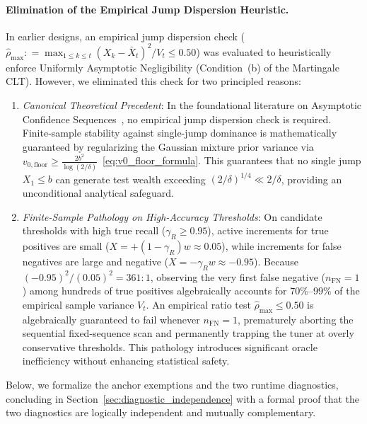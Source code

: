 \documentclass[11pt,a4paper]{article}
\newcommand{\coloneqq}{\mathrel{\mathop:}=}
\begin{document}
\paragraph{Elimination of the Empirical Jump Dispersion Heuristic.}
In earlier designs, an empirical jump dispersion check ($\hat{\rho}_{\max} \coloneqq \max_{1 \le k \le t}(X_k - \bar{X}_t)^2 / V_t \le 0.50$) was evaluated to heuristically enforce Uniformly Asymptotic Negligibility (Condition~(b) of the Martingale CLT). However, we eliminated this check for two principled reasons:
\begin{enumerate}[leftmargin=*]
    \item \emph{Canonical Theoretical Precedent}: In the foundational literature on Asymptotic Confidence Sequences~\cite{waudbysmith2024asymptotic,howard2021}, no empirical jump dispersion check is required. Finite-sample stability against single-jump dominance is mathematically guaranteed by regularizing the Gaussian mixture prior variance via $v_{0, \text{floor}} \ge \frac{2 b^2}{\log(2/\delta)}$~\eqref{eq:v0_floor_formula}. This guarantees that no single jump $X_1 \le b$ can generate test wealth exceeding $(2/\delta)^{1/4} \ll 2/\delta$, providing an unconditional analytical safeguard.
    \item \emph{Finite-Sample Pathology on High-Accuracy Thresholds}: On candidate thresholds with high true recall ($\gamma_R \ge 0.95$), active increments for true positives are small ($X = +(1 - \gamma_R) w \approx 0.05$), while increments for false negatives are large and negative ($X = -\gamma_R w \approx -0.95$). Because $(-0.95)^2 / (0.05)^2 = 361:1$, observing the very first false negative ($n_{\text{FN}} = 1$) among hundreds of true positives algebraically accounts for $70\%\text{--}99\%$ of the empirical sample variance $V_t$. An empirical ratio test $\hat{\rho}_{\max} \le 0.50$ is algebraically guaranteed to fail whenever $n_{\text{FN}} = 1$, prematurely aborting the sequential fixed-sequence scan and permanently trapping the tuner at overly conservative thresholds. This pathology introduces significant oracle inefficiency without enhancing statistical safety.
\end{enumerate}
Below, we formalize the anchor exemptions and the two runtime diagnostics, concluding in Section~\ref{sec:diagnostic_independence} with a formal proof that the two diagnostics are logically independent and mutually complementary.
\end{document}

